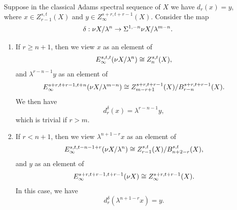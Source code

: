 \documentclass{amsart}
\numberwithin{equation}{section}
\begin{document}
\begin{proposition}\label{prop:6de7d130}
    Suppose in the classical Adams spectral sequence of $X$ we have $d_r(x)=y$, where $x\in Z_{r-1}^{s,t}(X)$ and $y\in Z_\infty^{s+r,t+r-1}(X)$. Consider the map
    $$\delta:\nu X/\lambda^n\to \Sigma^{1,-n}\nu X/\lambda^{m-n}.$$
    \begin{enumerate}
        \item If $r\ge n+1$, then we view $x$ as an element of 
        $$E_\infty^{s,t,t}(\nu X/\lambda^n)\cong Z_n^{s,t}(X),$$
        and $\lambda^{r-n-1} y$ as an element of 
        $$E_\infty^{s+r,t+r-1, t+n}(\nu X/\lambda^{m-n})\cong Z_{m-r+1}^{s+r,t+r-1}(X)/B_{r-n}^{s+r,t+r-1}(X).$$
        We then have
        $$d^{\delta}_r(x)=\lambda^{r-n-1}y,$$
        which is trivial if $r>m$.
        \item If $r<n+1$, then we view $\lambda^{n+1-r}x$ as an element of 
        $$E_\infty^{s,t,t-n-1+r}(\nu X/\lambda^n)\cong Z^{s,t}_{r-1}(X)/B^{s,t}_{n+2-r}(X),$$
        and $y$ as an element of 
        $$E_\infty^{s+r,t+r-1, t+r-1}(\nu X)\cong Z_\infty^{s+r,t+r-1}(X).$$
        In this case, we have
        $$d^{\delta}_r(\lambda^{n+1-r}x)=y.$$
    \end{enumerate}
\end{proposition}
\end{document}
